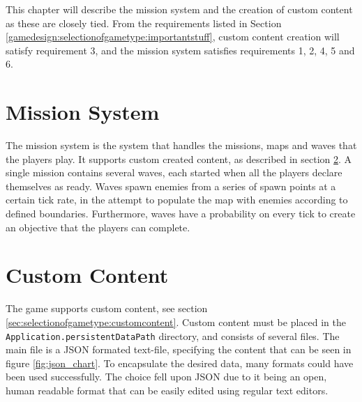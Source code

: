 This chapter will describe the mission system and the creation of custom content as these are closely tied.
From the requirements listed in Section \ref{gamedesign:selectionofgametype:importantstuff}, custom content creation will satisfy requirement 3, and the mission system satisfies requirements 1, 2, 4, 5 and 6.

\section{Mission System}

The mission system is the system that handles the missions, maps and waves that the players play.
It supports custom created content, as described in section \ref{sec:modules:missions:customcontent}.
A single mission contains several waves, each started when all the players declare themselves as ready.
Waves spawn enemies from a series of spawn points at a certain tick rate, in the attempt to populate the map with enemies according to defined boundaries.
Furthermore, waves have a probability on every tick to create an objective that the players can complete.

\section{Custom Content}\label{sec:modules:missions:customcontent}

The game supports custom content, see section \ref{sec:selectionofgametype:customcontent}.
Custom content must be placed in the \lstinline|Application.persistentDataPath| directory, and consists of several files.
The main file is a JSON formated text-file, specifying the content that can be seen in figure \ref{fig:json_chart}.
To encapsulate the desired data, many formats could have been used successfully.
The choice fell upon JSON due to it being an open, human readable format that can be easily edited using regular text editors.

